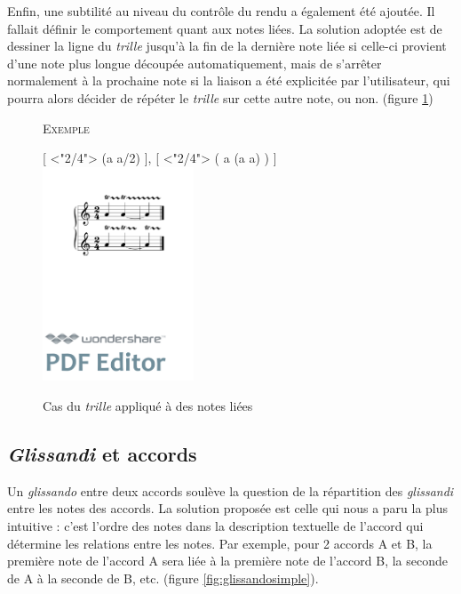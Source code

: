 \documentclass{article}
\newenvironment{gmncode}	{\vspace{-2mm}\small\verbatim}{\endverbatim\vspace{-2mm}}
\newcommand{\exemple}		{\vspace{2mm}\hspace*{-3mm}\textsc{Exemple}}
\begin{document}

Enfin, une subtilité au niveau du contr\^ole du rendu a également été ajoutée. Il fallait définir le comportement quant aux notes liées. La solution adoptée est de dessiner la ligne du \emph{trille} jusqu'à la fin de la dernière note liée si celle-ci provient d'une note plus longue découpée automatiquement, mais de s'arrêter normalement à la prochaine note si la liaison a été explicitée par l'utilisateur, qui pourra alors décider de répéter le \emph{trille} sur cette autre note, ou non. (figure \ref{fig:trill})

\begin{figure}[h]
\exemple
\begin{center}
\begin{gmncode}
{
  [
    \meter<"2/4"> \trill({a} {a/2})
  ],
  [
    \meter<"2/4"> \trill(
      {a} \tie({a} {a})
    )
  ]
}
\end{gmncode}
\includegraphics[width=45mm]{img/trill.pdf}
\end{center}
\caption{Cas du \emph{trille} appliqué à des notes liées}
\label{fig:trill}
\end{figure}


\subsection{\emph{Glissandi} et accords}\label{subsec:glissandiAccords}


Un \emph{glissando} entre deux accords soulève la question de la répartition des \emph{glissandi} entre les notes des accords. La solution proposée est celle qui nous a paru la plus intuitive : c'est l'ordre des notes dans la description textuelle de l'accord qui détermine les relations entre les notes. Par exemple, pour 2 accords A et B, la première note de l'accord A sera liée à la première note de l'accord B, la seconde de A à la seconde de B, etc. (figure \ref{fig:glissandosimple}).
\end{document}
